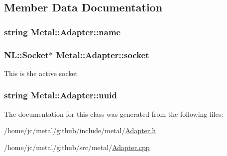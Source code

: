 \subsection{Member Data Documentation}
\hypertarget{classMetal_1_1Adapter_a8d86d5f95e20d3b9feeb4f0bedcf5785}{}
\subsubsection[{name}]{\setlength{\rightskip}{0pt plus 5cm}string Metal\+::\+Adapter\+::name\hspace{0.3cm}{\ttfamily [protected]}}\label{classMetal_1_1Adapter_a8d86d5f95e20d3b9feeb4f0bedcf5785}
\hypertarget{classMetal_1_1Adapter_a4326175a27a003918fafb0d738e64d1c}{}
\subsubsection[{socket}]{\setlength{\rightskip}{0pt plus 5cm}N\+L\+::\+Socket$\ast$ Metal\+::\+Adapter\+::socket\hspace{0.3cm}{\ttfamily [protected]}}\label{classMetal_1_1Adapter_a4326175a27a003918fafb0d738e64d1c}
This is the active socket \hypertarget{classMetal_1_1Adapter_a5175a897fa7c1ad65ebf03baea3c5479}{}
\subsubsection[{uuid}]{\setlength{\rightskip}{0pt plus 5cm}string Metal\+::\+Adapter\+::uuid\hspace{0.3cm}{\ttfamily [protected]}}\label{classMetal_1_1Adapter_a5175a897fa7c1ad65ebf03baea3c5479}


The documentation for this class was generated from the following files\+:\begin{DoxyCompactItemize}
\item 
/home/jc/metal/github/include/metal/\hyperlink{include_2metal_2Adapter_8h}{Adapter.\+h}\item 
/home/jc/metal/github/src/metal/\hyperlink{metal_2Adapter_8cpp}{Adapter.\+cpp}\end{DoxyCompactItemize}
